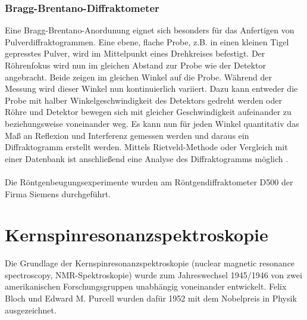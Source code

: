 \documentclass[a4paper, 11pt, headsepline,footsepline,twoside,abstract]{scrbook}
\begin{document}
\subsubsection{Bragg-Brentano-Diffraktometer}
Eine Bragg-Brentano-Anordunung eignet sich besonders für das Anfertigen von Pulverdiffraktogrammen. Eine ebene, flache Probe, z.B. in einen kleinen Tigel gepresstes Pulver, wird im Mittelpunkt eines Drehkreises befestigt. Der Röhrenfokus wird nun im gleichen Abstand zur Probe wie der Detektor angebracht. Beide zeigen im gleichen Winkel auf die Probe. Während der Messung wird dieser Winkel nun kontinuierlich variiert. Dazu kann entweder die Probe mit halber Winkelgeschwindigkeit des Detektors gedreht werden oder Röhre und Detektor bewegen sich mit gleicher Geschwindigkeit aufeinander zu beziehungsweise voneinander weg. Es kann nun für jeden Winkel quantitativ das Maß an Reflexion und Interferenz gemessen werden und daraus ein Diffraktogramm erstellt werden. Mittels Rietveld-Methode oder Vergleich mit einer Datenbank ist anschließend eine Analyse des Diffraktogramms möglich \cite{krischner1994}.
\\\\
Die Röntgenbeugungsexperimente wurden am Röntgendiffraktometer D500 der Firma Siemens durchgeführt. %
\section{Kernspinresonanzspektroskopie}
Die Grundlage der Kernspinresonanzspektroskopie (nuclear magnetic resonance spectroscopy, NMR-Spektroskopie) wurde zum Jahreswechsel 1945/1946 von zwei amerikanischen Forschungsgruppen unabhängig voneinander entwickelt. Felix Bloch und Edward M. Purcell wurden dafür 1952 mit dem Nobelpreis in Physik ausgezeichnet.
\end{document}
